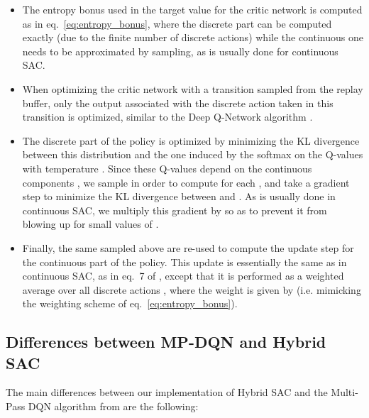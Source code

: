 \documentclass[letterpaper]{article} \usepackage{aaai20}  \usepackage{times}  \usepackage{helvet} \usepackage{courier}  \usepackage[hyphens]{url}  \usepackage{graphicx} \urlstyle{rm} \def\UrlFont{\rm}  \usepackage{graphicx}  \usepackage[section]{placeins}
\newcommand{\citet}{\cite}  \newcommand{\citep}{\cite} \DeclareMathOperator*{\softmax}{softmax}
\begin{document}
\begin{itemize} \label{appendix_differences}
    \item The entropy bonus used in the target value for the critic network  is computed as in eq.~\ref{eq:entropy_bonus}, where the discrete part can be computed exactly (due to the finite number of discrete actions) while the continuous one needs to be approximated by sampling, as is usually done for continuous SAC.
    \item When optimizing the critic network  with a transition sampled from the replay buffer, only the output associated with the discrete action taken in this transition is optimized, similar to the Deep Q-Network algorithm \citep{mnih2015human}.
    \item The discrete part  of the policy is optimized by minimizing the KL divergence between this distribution and the one induced by the softmax on the Q-values with temperature .
    Since these Q-values depend on the continuous components , we sample  in order to compute  for each , and take a gradient step to minimize the KL divergence between  and .
    As is usually done in continuous SAC, we multiply this gradient by  so as to prevent it from blowing up for small values of .
    \item Finally, the same  sampled above are re-used to compute the update step for the continuous part of the policy. This update is essentially the same as in continuous SAC, as in eq.~7 of \citet{haarnoja2018softapplications}, except that it is performed as a weighted average over all discrete actions , where the weight is given by  (i.e. mimicking the weighting scheme of eq.~\ref{eq:entropy_bonus}).
\end{itemize}

\subsection{Differences between MP-DQN and Hybrid SAC}

The main differences between our implementation of Hybrid SAC and the Multi-Pass DQN algorithm from \citet{bester2019} are the following:
\end{document}
